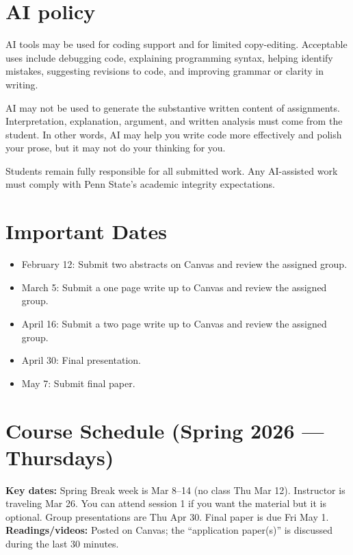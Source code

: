 \documentclass[letterpaper,11pt]{article}
\begin{document}
\section*{AI policy}
AI tools may be used for coding support and for limited copy-editing. Acceptable uses include debugging code, explaining programming syntax, helping identify mistakes, suggesting revisions to code, and improving grammar or clarity in writing.\bigskip

\noindent AI may not be used to generate the substantive written content of assignments. Interpretation, explanation, argument, and written analysis must come from the student. In other words, AI may help you write code more effectively and polish your prose, but it may not do your thinking for you.\bigskip

\noindent Students remain fully responsible for all submitted work. Any AI-assisted work must comply with Penn State’s academic integrity expectations.


\section*{Important Dates}
\begin{itemize}
\item February 12: Submit two abstracts on Canvas and review the assigned group. 
\item March 5: Submit a one page write up to Canvas and review the assigned group. 
\item April 16: Submit a two page write up to Canvas and review the assigned group. 
\item April 30: Final presentation.
\item May 7: Submit final paper. 
\end{itemize}

\section*{Course Schedule (Spring 2026 --- Thursdays)}
\noindent \textbf{Key dates:} Spring Break week is Mar 8--14 (no class Thu Mar 12). Instructor is traveling Mar 26. You can attend session 1 if you want the material but it is optional. Group presentations are Thu Apr 30. Final paper is due Fri May 1.
\noindent \textbf{Readings/videos:} Posted on Canvas; the ``application paper(s)'' is discussed during the last 30 minutes.
\end{document}
